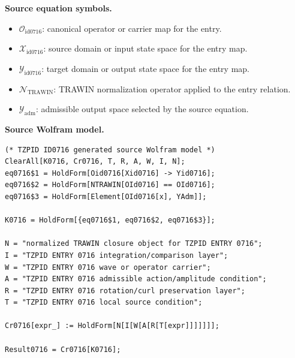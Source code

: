 \begin{minipage}[t]{0.49\linewidth}
\begingroup
\small
\raggedright
\textbf{Source equation symbols.}\par
\begin{itemize}[leftmargin=1.35em,itemsep=1pt,topsep=1pt,parsep=0pt]
    \item $\mathcal{O}_{\mathrm{id0716}}$: canonical operator or carrier map for the entry.
    \item $\mathcal{X}_{\mathrm{id0716}}$: source domain or input state space for the entry map.
    \item $\mathcal{Y}_{\mathrm{id0716}}$: target domain or output state space for the entry map.
    \item $\mathcal{N}_{\mathrm{TRAWIN}}$: TRAWIN normalization operator applied to the entry relation.
    \item $\mathcal{Y}_{\mathrm{adm}}$: admissible output space selected by the source equation.
\end{itemize}
\endgroup
\end{minipage}\hfill
\begin{minipage}[t]{0.47\linewidth}
\begingroup
\scriptsize
\raggedright
\textbf{Source Wolfram model.}\par
\begin{Verbatim}[fontsize=\tiny,breaklines=true,breakanywhere=true]
(* TZPID ID0716 generated source Wolfram model *)
ClearAll[K0716, Cr0716, T, R, A, W, I, N];
eq0716$1 = HoldForm[Oid0716[Xid0716] -> Yid0716];
eq0716$2 = HoldForm[NTRAWIN[OId0716] == OId0716];
eq0716$3 = HoldForm[Element[OId0716[x], YAdm]];

K0716 = HoldForm[{eq0716$1, eq0716$2, eq0716$3}];

N = "normalized TRAWIN closure object for TZPID ENTRY 0716";
I = "TZPID ENTRY 0716 integration/comparison layer";
W = "TZPID ENTRY 0716 wave or operator carrier";
A = "TZPID ENTRY 0716 admissible action/amplitude condition";
R = "TZPID ENTRY 0716 rotation/curl preservation layer";
T = "TZPID ENTRY 0716 local source condition";

Cr0716[expr_] := HoldForm[N[I[W[A[R[T[expr]]]]]]];

Result0716 = Cr0716[K0716];
\end{Verbatim}
\endgroup
\end{minipage}

